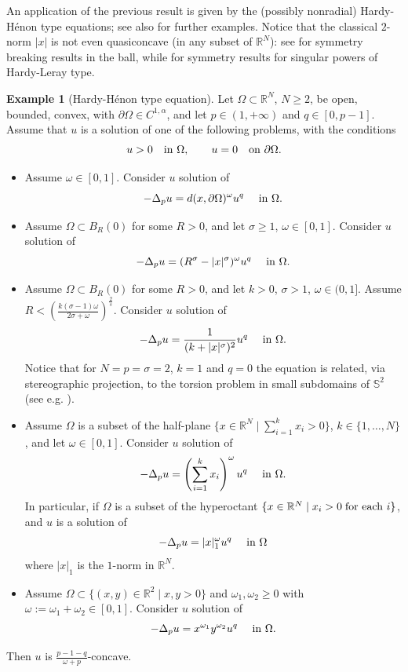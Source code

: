 \documentclass[11pt, reqno]{amsart}
\theoremstyle{definition}
\newtheorem{example}[lemma]{Example}
\numberwithin{equation}{section}
\newcommand{\R}{\mathbb{R}}
\begin{document}
An application of the previous result is given by the (possibly nonradial) Hardy-Hénon type equations; see also \cite[Remark 2.3]{LeVa08} for further examples. 
Notice that the classical $2$-norm $|x|$ is not even quasiconcave (in any subset of $\R^N$): see \cite{AmGl14} for symmetry breaking results in the ball, while \cite{AvBr20} for symmetry results for singular powers of Hardy-Leray type. 

\begin{example}[Hardy-Hénon type equation]
\label{exam_hardy_henon}
Let $\Omega \subset \R^N$, $N\geq 2$, be open, bounded, convex, with $\partial \Omega \in C^{1,\alpha}$, and let $p\in (1,+\infty)$ and $q \in [0,p-1]$. 
Assume that $u$ is a solution of one of the following problems, with the conditions
$$u>0 \quad \hbox{in $\Omega$}, \qquad u=0 \quad \hbox{on $\partial \Omega$.}$$
\begin{itemize}
\item Assume $\omega \in [0,1]$. Consider $u$ solution of
$$-\Delta_p u = d(x, \partial \Omega)^{\omega} u^q \quad \hbox{ in $\Omega$}.$$
\item Assume $\Omega \subset B_R(0)$ for some $R>0$, and let $\sigma \geq 1$, $\omega \in [0,1]$. Consider $u$ solution of
$$-\Delta_p u = (R^{\sigma}-|x|^{\sigma})^{\omega} u^q \quad \hbox{ in $\Omega$}.$$
\item Assume $\Omega \subset B_R(0)$ for some $R>0$, and let $k>0$, $\sigma>1$, $\omega \in (0,1]$. Assume $R < \left(\frac{k(\sigma-1)\omega}{2 \sigma +\omega}\right)^{\frac{2}{s}}$. 
Consider $u$ solution of
$$-\Delta_p u = \frac{1}{(k + |x|^{\sigma})^2} u^q \quad \hbox{ in $\Omega$}.$$
Notice that for $N=p=\sigma=2$, $k=1$ and $q=0$ the equation is related, via stereographic projection, to the torsion problem in small subdomains of $\mathbb{S}^2$ (see e.g. \cite[Theorem 1.5 and its proof]{KST24}).
\item
Assume $\Omega$ is a subset of the half-plane $\{ x\in \R^N \mid \sum_{i=1}^k x_i > 0\}$, $k \in \{1,\dots,N\}$, and let $\omega \in [0,1]$.
Consider $u$ solution of 
$$-\Delta_p u = \left(\sum_{i=1}^k x_i\right)^{\omega} u^q \quad \hbox{ in $\Omega$}.$$
In particular, if $\Omega$ is a subset of the hyperoctant $\{ x\in \R^N \mid x_i > 0 \; \hbox{for each $i$}\}$, and $u$ is a solution of
$$-\Delta_p u = |x|_1^{\omega} u^q \quad \hbox{ in $\Omega$}$$
where $|x|_1$ is the $1$-norm in $\R^N$.
\item Assume $\Omega \subset \{(x,y) \in \R^2 \mid x,y > 0\}$ and $\omega_1, \omega_2 \geq 0$ with $\omega:= \omega_1+\omega_2 \in [0,1]$. 
Consider $u$ solution of
$$-\Delta_p u = x^{\omega_1} y^{\omega_2} u^q \quad \hbox{ in $\Omega$}.$$
\end{itemize}
Then $u$ is $\frac{p-1-q}{\omega+ p}$-concave. 
\end{example}
\end{document}
